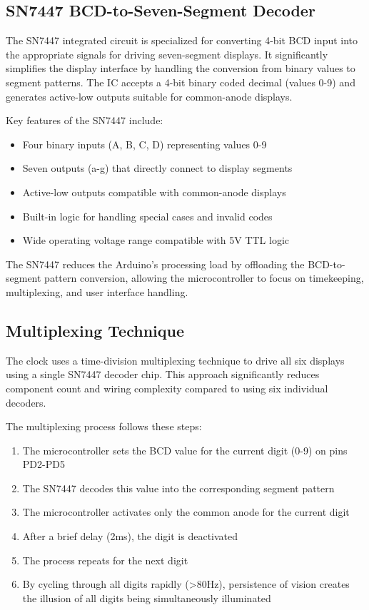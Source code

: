 \documentclass{article}
\begin{document}
\subsection{SN7447 BCD-to-Seven-Segment Decoder}
The SN7447 integrated circuit is specialized for converting 4-bit BCD input into the appropriate signals for driving seven-segment displays. It significantly simplifies the display interface by handling the conversion from binary values to segment patterns. The IC accepts a 4-bit binary coded decimal (values 0-9) and generates active-low outputs suitable for common-anode displays.

Key features of the SN7447 include:
\begin{itemize}
\item Four binary inputs (A, B, C, D) representing values 0-9
\item Seven outputs (a-g) that directly connect to display segments
\item Active-low outputs compatible with common-anode displays
\item Built-in logic for handling special cases and invalid codes
\item Wide operating voltage range compatible with 5V TTL logic
\end{itemize}

The SN7447 reduces the Arduino's processing load by offloading the BCD-to-segment pattern conversion, allowing the microcontroller to focus on timekeeping, multiplexing, and user interface handling.

\subsection{Multiplexing Technique}
The clock uses a time-division multiplexing technique to drive all six displays using a single SN7447 decoder chip. This approach significantly reduces component count and wiring complexity compared to using six individual decoders.

The multiplexing process follows these steps:
\begin{enumerate}
\item The microcontroller sets the BCD value for the current digit (0-9) on pins PD2-PD5
\item The SN7447 decodes this value into the corresponding segment pattern
\item The microcontroller activates only the common anode for the current digit
\item After a brief delay (2ms), the digit is deactivated
\item The process repeats for the next digit
\item By cycling through all digits rapidly (>80Hz), persistence of vision creates the illusion of all digits being simultaneously illuminated
\end{enumerate}
\end{document}

